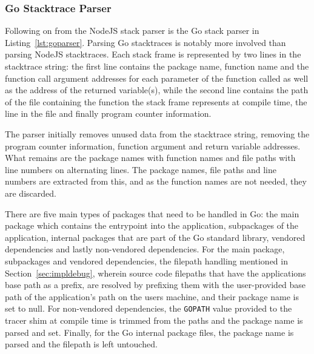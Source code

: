 \documentclass[12pt,pdftex,titlepage]{report}
\begin{document}
                \subsubsection{Go Stacktrace Parser}
                \label{sec:goparser}
                    Following on from the NodeJS stack parser is the Go stack parser in Listing~\ref{lst:goparser}. Parsing Go stacktraces is notably more involved than parsing NodeJS 
                    stacktraces. Each stack frame is represented by two lines in the stacktrace string: the first line contains the package name, function name and the function call argument 
                    addresses for each parameter of the function called as well as the address of the returned variable(s), while the second line contains the path of the file containing the 
                    function the stack frame represents at compile time, the line in the file and finally program counter information. 

                    The parser initially removes unused data from the stacktrace string, removing the program counter information, function argument and return variable addresses. What remains
                    are the package names with function names and file paths with line numbers on alternating lines. The package names, file paths and line numbers are extracted from this, and
                    as the function names are not needed, they are discarded. 

                    There are five main types of packages that need to be handled in Go: the main package which contains the entrypoint into the application, subpackages of the application,
                    internal packages that are part of the Go standard library, vendored dependencies and lastly non-vendored dependencies. For the main package, subpackages and vendored
                    dependencies, the filepath handling mentioned in Section~\ref{sec:impldebug}, wherein source code filepaths that have the applications base path as a prefix, are resolved by prefixing
                    them with the user-provided base path of the application's path on the users machine, and their package name is set to null. For non-vendored dependencies, the \texttt{GOPATH} 
                    value provided to the tracer shim at compile time is trimmed from the paths and the package name is parsed and set. Finally, for the Go internal package files, the package name
                    is parsed and the filepath is left untouched.
\end{document}
